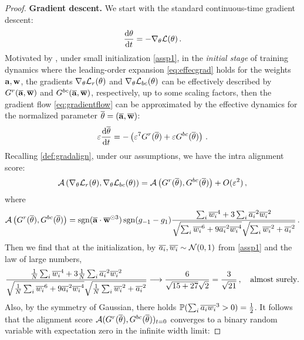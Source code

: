 \begin{proof}
    \noindent 
{\bf Gradient descent.} We start with the standard continuous-time gradient descent: 
\begin{align} \label{eq:gradientflow}
    \frac{{\rm d} \theta}{{\rm d} t} = - \nabla_{\theta} \mathcal{L}(\theta)\,.
\end{align}
Motivated by \cite{zhou2022towards,chen2024dynamics}, under small initialization \cref{assp1}, in the \emph{initial stage} of training dynamics where the leading-order expansion \eqref{eq:effecgrad} holds for the weights $\mathbf{a}, \mathbf{w}$, the gradients $ \nabla_\theta \mathcal{L}_r(\theta)$ and $\nabla_{\theta} \mathcal{L}_{bc}(\theta)$ can be effectively described by  $G^r(\overline{\mathbf{a}},\overline{\mathbf{w}})$ and $G^{bc}(\overline{\mathbf{a}},\overline{\mathbf{w}})$, respectively, up to some scaling factors, then the gradient flow \eqref{eq:gradientflow} can be approximated by the effective dynamics for the normalized parameter $\overline{\theta} = (\overline{\mathbf{a}},\overline{\mathbf{w}})$: 
\begin{align} \label{eq:effdym}
    \varepsilon \frac{{\rm d} \overline{\theta}}{{\rm d} t} = - \left(\varepsilon^7 G^r(\overline{\theta}) + \varepsilon G^{bc}(\overline{\theta}) \right)\,.    
\end{align}
Recalling \cref{def:gradalign}, under our assumptions, we have the intra alignment score:
\begin{align*}
    \mathcal{A}\left(\nabla_\theta \mathcal{L}_r(\theta), \nabla_\theta \mathcal{L}_{bc}(\theta) \right) = \mathcal{A}\left( G^r(\overline{\theta}) , G^{bc}(\overline{\theta})  \right) + O(\varepsilon^2)\,,
\end{align*}
where 
\begin{align*}
    \mathcal{A}\left( G^r(\overline{\theta}) , G^{bc}(\overline{\theta})  \right) = \operatorname{sgn} (\overline{\mathbf{a}} \cdot \overline{\mathbf{w}}^{\odot 3}) \operatorname{sgn} (g_{-1} - g_1) \frac{\sum_i \overline{w_i}^4 + 3 \sum_i \overline{a_i}^2 \overline{w_i}^2}{\sqrt{\sum_i \overline{w_i}^6 + 9 \overline{a_i}^2 \overline{w_i}^4} \sqrt{\sum_i \overline{w_i}^2 + \overline{a_i}^2}}\,.
\end{align*}
Then we find that at the initialization, by
$\overline{a_i}, \overline{w_i} \sim \mathcal{N}(0,1)$ from \cref{assp1} and the law of large numbers, 
\begin{equation*}
    \frac{\frac{1}{N}\sum_i \overline{w_i}^4 + 3 \frac{1}{N} \sum_i \overline{a_i}^2 \overline{w_i}^2}{\sqrt{\frac{1}{N}\sum_i \overline{w_i}^6 + 9 \overline{a_i}^2 \overline{w_i}^4} \sqrt{\frac{1}{N}\sum_i \overline{w_i}^2 + \overline{a_i}^2}} \longrightarrow \frac{6}{\sqrt{15 + 27} \sqrt{2}} = \frac{3}{\sqrt{21}}\,,\quad \text{almost surely}.
\end{equation*}
Also, by the symmetry of Gaussian, there holds 
$\mathbb{P}(\sum_i \overline{a_i} \overline{w_i}^3 > 0) = \frac{1}{2}$. It follows that the alignment score $\mathcal{A}( G^r(\overline{\theta}) , G^{bc}(\overline{\theta}))_{t = 0}$ converges to a binary random variable with expectation zero in the infinite width limit: 

\end{proof}
